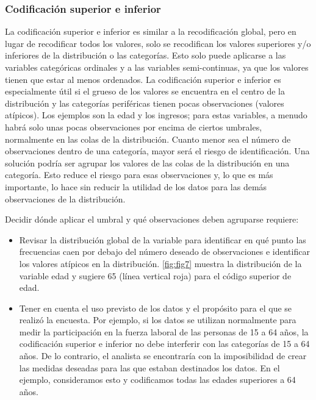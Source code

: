 \documentclass[]{book}
\providecommand{\tightlist}{%
  \setlength{\itemsep}{0pt}\setlength{\parskip}{0pt}}
\theoremstyle{definition}
\theoremstyle{definition}
\theoremstyle{definition}
\theoremstyle{definition}
\theoremstyle{remark}
\begin{document}
\hypertarget{cod-sup-inf}{%
\subsubsection{Codificación superior e inferior}\label{cod-sup-inf}}

La codificación superior e inferior es similar a la recodificación global, pero en lugar de recodificar todos los valores, solo se recodifican los valores superiores y/o inferiores de la distribución o las categorías. Esto solo puede aplicarse a las variables categóricas ordinales y a las variables semi-continuas, ya que los valores tienen que estar al menos ordenados. La codificación superior e inferior es especialmente útil si el grueso de los valores se encuentra en el centro de la distribución y las categorías periféricas tienen pocas observaciones (valores atípicos). Los ejemplos son la edad y los ingresos; para estas variables, a menudo habrá solo unas pocas observaciones por encima de ciertos umbrales, normalmente en las colas de la distribución. Cuanto menor sea el número de observaciones dentro de una categoría, mayor será el riesgo de identificación. Una solución podría ser agrupar los valores de las colas de la distribución en una categoría. Esto reduce el riesgo para esas observaciones y, lo que es más importante, lo hace sin reducir la utilidad de los datos para las demás observaciones de la distribución.

Decidir dónde aplicar el umbral y qué observaciones deben agruparse requiere:

\begin{itemize}
\tightlist
\item
  Revisar la distribución global de la variable para identificar en qué punto las frecuencias caen por debajo del número deseado de observaciones e identificar los valores atípicos en la distribución. \ref{fig:fig7} muestra la distribución de la variable edad y sugiere 65 (línea vertical roja) para el código superior de edad.
\item
  Tener en cuenta el uso previsto de los datos y el propósito para el que se realizó la encuesta. Por ejemplo, si los datos se utilizan normalmente para medir la participación en la fuerza laboral de las personas de 15 a 64 años, la codificación superior e inferior no debe interferir con las categorías de 15 a 64 años. De lo contrario, el analista se encontraría con la imposibilidad de crear las medidas deseadas para las que estaban destinados los datos. En el ejemplo, consideramos esto y codificamos todas las edades superiores a 64 años.
\end{itemize}
\end{document}
